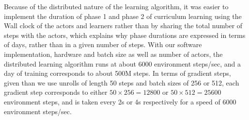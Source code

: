 Because of the distributed nature of the learning algorithm, it was easier to implement the duration of phase 1 and phase 2 of curriculum learning using the Wall clock of the actors and learners rather than by sharing the total number of steps with the actors, which explains why phase durations are expressed in terms of days, rather than in a given number of steps. With our software implementation, hardware and batch size as well as number of actors, the distributed learning algorithm runs at about 6000 environment steps/sec, and a day of training corresponds to about 500M steps. In terms of gradient steps, given than we use unrolls of length 50 steps and batch sizes of 256 or 512, each gradient step corresponds to either $50\times256=12800$ or $50\times512=25600$ environment steps, and is taken every 2s or 4s respectively for a speed of 6000 environment steps/sec.

